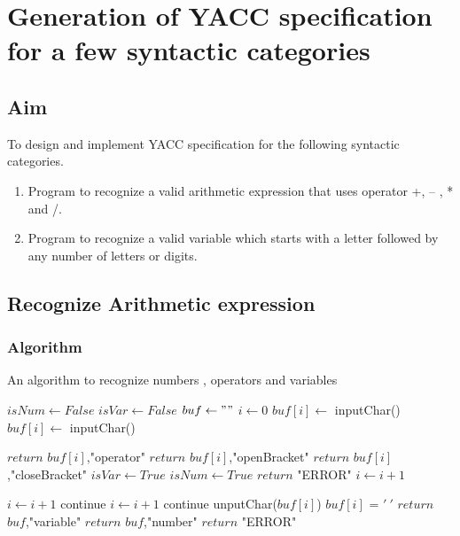 \clearpage
\chapter{Generation of YACC specification for a few syntactic categories}

\section{Aim}
To design and implement YACC specification for the following syntactic categories.
\begin{enumerate}
	\item Program to recognize a valid arithmetic expression that uses operator +, – , * and /.
	\item Program to recognize a valid variable which starts with a letter followed by any	number of letters or digits.
\end{enumerate}


\section{Recognize Arithmetic expression}
\subsection{Algorithm}
\begin{algorithm}[H]
	\caption{An algorithm to recognize numbers , operators and variables}
	\begin{algorithmic}[1]
		\State $isNum \gets False$
		\State $isVar \gets False$
		\State $buf \gets ""$
		\State $i \gets 0$
		\State $buf[i] \gets $ inputChar()
		\State $buf[i] \gets $ inputChar()
		\EndWhile
		
		\State $return$ $buf[i]$,"operator"
		\State $return$ $buf[i]$,"openBracket"
		\State $return$ $buf[i]$,"closeBracket"
		\State $isVar \gets True$
		\State $isNum \gets True$
		\Else
		\State $return$ "ERROR"
		\EndIf
		\State $i \gets i+1$
		
		\State $i \gets i + 1$
		\State continue
		\State $i \gets i + 1$
		\State continue
		\Else
		\State unputChar($buf[i]$) 
		\State $buf[i]$ = $'\ '$
		\State $return$ $buf$,"variable"
		\State $return$ $buf$,"number"
		\Else
		\State $return$ "ERROR"
		\EndIf
		\EndIf
		\EndWhile
	\end{algorithmic}
\end{algorithm}

